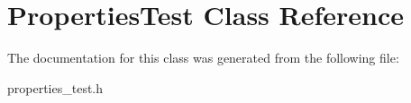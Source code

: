 \hypertarget{classPropertiesTest}{\section{\-Properties\-Test \-Class \-Reference}
\label{classPropertiesTest}
}


\-The documentation for this class was generated from the following file\-:\begin{DoxyCompactItemize}
\item 
properties\-\_\-test.\-h\end{DoxyCompactItemize}

